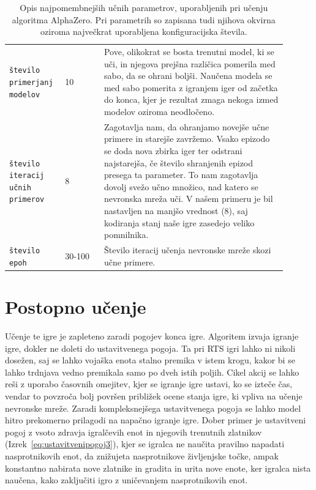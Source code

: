\documentclass[a4paper, 12pt]{book}
\begin{document}
{\begin{table}
	\begin{center}
		\begin{tabular}{p{0.16\linewidth}|p{0.13\linewidth}|p{0.61\linewidth}}

			{\tt število primerjanj modelov}  		  & 10 						& Pove, olikokrat se bosta trenutni model, ki se uči, in njegova prejšna različica pomerila med sabo, da se ohrani boljši.
																				  Naučena modela se med sabo pomerita z igranjem iger od začetka do konca, kjer je rezultat zmaga nekoga izmed modelov oziroma neodločeno.\\
			{\tt število iteracij učnih primerov}     & 8 						& Zagotavlja nam, da ohranjamo novejše učne primere in starejše zavržemo.
																				  Vsako epizodo se doda nova zbirka iger ter odstrani najstarejša, če število shranjenih epizod presega ta parameter.
																				  To nam zagotavlja dovolj svežo učno množico, nad katero se nevronska mreža uči.
																				  V našem primeru je bil nastavljen na manjšo vrednost (8), saj kodiranja stanj naše igre zasedejo veliko pomnilnika.\\
			{\tt število epoh}     					  & 30-100 				    & Število iteracij učenja nevronske mreže skozi učne primere.\\
		\end{tabular}
	\end{center}
	\caption{Opis najpomembnejših učnih parametrov, uporabljenih pri učenju algoritma AlphaZero. Pri parametrih so zapisana tudi njihova okvirna oziroma največkrat uporabljena konfiguracijska števila.}
	\label{tableParameters2}
\end{table}

\section{Postopno učenje}
Učenje te igre je zapleteno zaradi pogojev konca igre. 
Algoritem izvaja igranje igre, dokler ne doleti do ustavitvenega pogoja.
Ta pri RTS igri lahko ni nikoli dosežen, saj se lahko vojaška enota stalno premika v istem krogu, kakor bi se lahko trdnjava vedno premikala samo po dveh istih poljih.
Cikel akcij se lahko reši z uporabo časovnih omejitev, kjer se igranje igre ustavi, ko se izteče čas, vendar to povzroča bolj površen približek ocene stanja igre, ki vpliva na učenje nevronske mreže.
Zaradi kompleksnejšega ustavitvenega pogoja se lahko model hitro prekomerno prilagodi na napačno igranje igre.
Dober primer je ustavitveni pogoj z vsoto zdravja igralčevih enot in njegovih trenutnih zlatnikov (Izrek~\ref{eq:ustavitvenipogoj3}), kjer se igralca ne naučita pravilno napadati nasprotnikovih enot, da znižujeta nasprotnikove življenjske točke, ampak konstantno nabirata nove zlatnike in gradita in urita nove enote, ker igralca nista naučena, kako zaključiti igro z uničevanjem nasprotnikovih enot.

}
\end{document}
